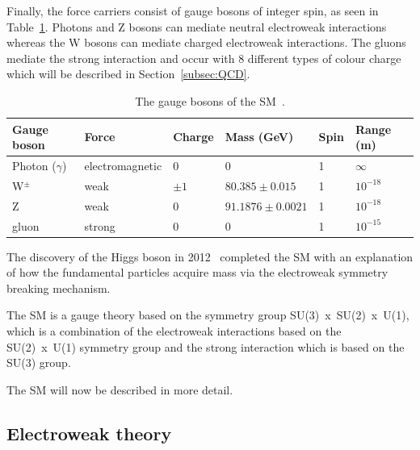 Finally, the force carriers consist of gauge bosons of integer spin, as seen in Table~\ref{table:SMbosons}. Photons and Z bosons can mediate neutral electroweak interactions whereas the W bosons can mediate charged electroweak interactions. The gluons mediate the strong interaction and occur with 8 different types of colour charge which will be described in Section~\ref{subsec:QCD}. 
\begin{table}[ht!]
\centering
\footnotesize
\begin{tabular}{|l|l|l|l|l|l|}
\hline
Gauge boson                       & Force           & Charge & Mass (GeV) & Spin & Range (m)  \\ \hline \hline
Photon ($\gamma$)                 & electromagnetic & 0      & 0          & 1    & $\infty$   \\ \hline
W$^{\pm}$                         & weak            & $\pm1$ & $80.385\pm0.015$           & 1    & $10^{-18}$ \\ \hline
Z                                 & weak            & 0      & $91.1876\pm0.0021$           & 1    & $10^{-18}$ \\ \hline
gluon                             & strong          & 0      & 0          & 1    & $10^{-15}$ \\ \hline
\end{tabular}
\caption{The gauge bosons of the SM~\cite{PDG2016}.}
\label{table:SMbosons}

\end{table}

The discovery of the Higgs boson in 2012~\cite{Higgs2012observation,Aad:2012tfa,Aad:2015zhl} completed the SM with an explanation of how the fundamental particles acquire mass via the electroweak symmetry breaking mechanism.

The SM is a gauge theory based on the symmetry group SU(3)~x~SU(2)~x~U(1), which is a combination of the electroweak interactions based on the SU(2)~x~U(1) symmetry group and the strong interaction which is based on the SU(3) group.

The SM will now be described in more detail.

\subsection{Electroweak theory}

